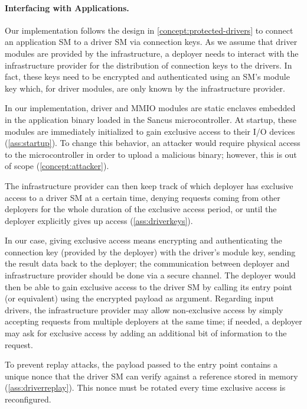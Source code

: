 \paragraph*{Interfacing with Applications.}
\label{concept:app-io-interface}

Our implementation follows the design in \cref{concept:protected-drivers} to
connect an application \ac{SM} to a driver \ac{SM} via connection keys. As we
assume that driver modules are provided by the infrastructure, a deployer needs
to interact with the infrastructure provider for the distribution of connection
keys to the drivers. In fact, these keys need to be encrypted and authenticated
using an \ac{SM}'s module key which, for driver modules, are only known by the
infrastructure provider.

In our implementation, driver and \ac{MMIO} modules are static enclaves embedded
in the application binary loaded in the Sancus microcontroller. At startup,
these modules are immediately initialized to gain exclusive access to their I/O
devices (\ref{ass:startup}). To change this behavior, an attacker would require
physical access to the microcontroller in order to upload a malicious binary;
however, this is out of scope (\cref{concept:attacker}).

The infrastructure provider can then keep track of which deployer has exclusive
access to a driver \ac{SM} at a certain time, denying requests coming from other
deployers for the whole duration of the exclusive access period, or
until the deployer explicitly gives up access (\ref{ass:driverkeys}).

In our case, giving exclusive access means encrypting and
authenticating the connection key (provided by the deployer) with the driver's
module key, sending the result data back to the deployer; the communication
between deployer and infrastructure provider should be done via a secure
channel. The deployer would then be able to gain exclusive access to the driver
\ac{SM} by calling its \setkey{} entry point (or equivalent) using the encrypted
payload as argument. Regarding input drivers, the infrastructure provider may
allow non-exclusive access by simply accepting requests from multiple deployers
at the same time; if needed, a deployer may ask for exclusive access by adding
an additional bit of information to the request.

To prevent replay attacks, the payload passed to the \setkey{} entry point
contains a unique nonce that the driver \ac{SM} can verify against a
reference stored in memory (\ref{ass:driverreplay}). This nonce must be rotated
every time exclusive access is reconfigured.

